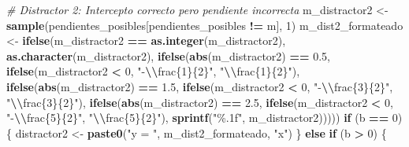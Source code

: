 \documentclass[
]{article}
\newenvironment{Shaded}{\begin{snugshade}}{\end{snugshade}}
\newcommand{\CommentTok}[1]{\textcolor[rgb]{0.56,0.35,0.01}{\textit{#1}}}
\newcommand{\ControlFlowTok}[1]{\textcolor[rgb]{0.13,0.29,0.53}{\textbf{#1}}}
\newcommand{\DecValTok}[1]{\textcolor[rgb]{0.00,0.00,0.81}{#1}}
\newcommand{\FloatTok}[1]{\textcolor[rgb]{0.00,0.00,0.81}{#1}}
\newcommand{\FunctionTok}[1]{\textcolor[rgb]{0.13,0.29,0.53}{\textbf{#1}}}
\newcommand{\NormalTok}[1]{#1}
\newcommand{\OtherTok}[1]{\textcolor[rgb]{0.56,0.35,0.01}{#1}}
\newcommand{\SpecialCharTok}[1]{\textcolor[rgb]{0.81,0.36,0.00}{\textbf{#1}}}
\newcommand{\StringTok}[1]{\textcolor[rgb]{0.31,0.60,0.02}{#1}}
\begin{document}
\begin{Shaded}
\begin{Highlighting}[]
  \CommentTok{\# Distractor 2: Intercepto correcto pero pendiente incorrecta}
\NormalTok{  m\_distractor2 }\OtherTok{\textless{}{-}} \FunctionTok{sample}\NormalTok{(pendientes\_posibles[pendientes\_posibles }\SpecialCharTok{!=}\NormalTok{ m], }\DecValTok{1}\NormalTok{)}
\NormalTok{  m\_dist2\_formateado }\OtherTok{\textless{}{-}} \FunctionTok{ifelse}\NormalTok{(m\_distractor2 }\SpecialCharTok{==} \FunctionTok{as.integer}\NormalTok{(m\_distractor2), }
                               \FunctionTok{as.character}\NormalTok{(m\_distractor2),}
                               \FunctionTok{ifelse}\NormalTok{(}\FunctionTok{abs}\NormalTok{(m\_distractor2) }\SpecialCharTok{==} \FloatTok{0.5}\NormalTok{, }
                                      \FunctionTok{ifelse}\NormalTok{(m\_distractor2 }\SpecialCharTok{\textless{}} \DecValTok{0}\NormalTok{, }\StringTok{"{-}}\SpecialCharTok{\textbackslash{}\textbackslash{}}\StringTok{frac\{1\}\{2\}"}\NormalTok{, }\StringTok{"}\SpecialCharTok{\textbackslash{}\textbackslash{}}\StringTok{frac\{1\}\{2\}"}\NormalTok{),}
                                      \FunctionTok{ifelse}\NormalTok{(}\FunctionTok{abs}\NormalTok{(m\_distractor2) }\SpecialCharTok{==} \FloatTok{1.5}\NormalTok{, }
                                             \FunctionTok{ifelse}\NormalTok{(m\_distractor2 }\SpecialCharTok{\textless{}} \DecValTok{0}\NormalTok{, }\StringTok{"{-}}\SpecialCharTok{\textbackslash{}\textbackslash{}}\StringTok{frac\{3\}\{2\}"}\NormalTok{, }\StringTok{"}\SpecialCharTok{\textbackslash{}\textbackslash{}}\StringTok{frac\{3\}\{2\}"}\NormalTok{),}
                                             \FunctionTok{ifelse}\NormalTok{(}\FunctionTok{abs}\NormalTok{(m\_distractor2) }\SpecialCharTok{==} \FloatTok{2.5}\NormalTok{, }
                                                    \FunctionTok{ifelse}\NormalTok{(m\_distractor2 }\SpecialCharTok{\textless{}} \DecValTok{0}\NormalTok{, }\StringTok{"{-}}\SpecialCharTok{\textbackslash{}\textbackslash{}}\StringTok{frac\{5\}\{2\}"}\NormalTok{, }\StringTok{"}\SpecialCharTok{\textbackslash{}\textbackslash{}}\StringTok{frac\{5\}\{2\}"}\NormalTok{),}
                                                    \FunctionTok{sprintf}\NormalTok{(}\StringTok{"\%.1f"}\NormalTok{, m\_distractor2)))))}
  \ControlFlowTok{if}\NormalTok{ (b }\SpecialCharTok{==} \DecValTok{0}\NormalTok{) \{}
\NormalTok{    distractor2 }\OtherTok{\textless{}{-}} \FunctionTok{paste0}\NormalTok{(}\StringTok{"y = "}\NormalTok{, m\_dist2\_formateado, }\StringTok{"x"}\NormalTok{)}
\NormalTok{  \} }\ControlFlowTok{else} \ControlFlowTok{if}\NormalTok{ (b }\SpecialCharTok{\textgreater{}} \DecValTok{0}\NormalTok{) \{}

\end{Highlighting}
\end{Shaded}
\end{document}
